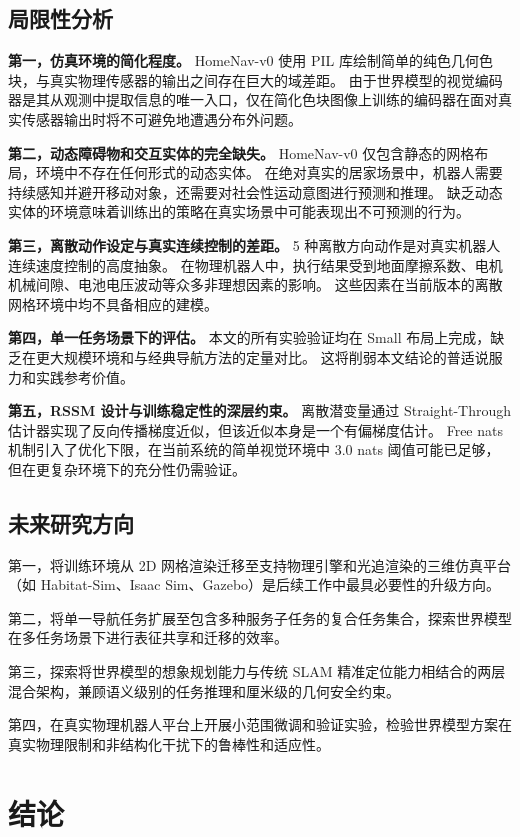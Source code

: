 \documentclass[12pt,a4paper]{ctexart}
\begin{document}
\subsection{局限性分析}

\textbf{第一，仿真环境的简化程度。}
HomeNav-v0 使用 PIL 库绘制简单的纯色几何色块，与真实物理传感器的输出之间存在巨大的域差距。
由于世界模型的视觉编码器是其从观测中提取信息的唯一入口，仅在简化色块图像上训练的编码器在面对真实传感器输出时将不可避免地遭遇分布外问题。

\textbf{第二，动态障碍物和交互实体的完全缺失。}
HomeNav-v0 仅包含静态的网格布局，环境中不存在任何形式的动态实体。
在绝对真实的居家场景中，机器人需要持续感知并避开移动对象，还需要对社会性运动意图进行预测和推理。
缺乏动态实体的环境意味着训练出的策略在真实场景中可能表现出不可预测的行为。

\textbf{第三，离散动作设定与真实连续控制的差距。}
5 种离散方向动作是对真实机器人连续速度控制的高度抽象。
在物理机器人中，执行结果受到地面摩擦系数、电机机械间隙、电池电压波动等众多非理想因素的影响。
这些因素在当前版本的离散网格环境中均不具备相应的建模。

\textbf{第四，单一任务场景下的评估。}
本文的所有实验验证均在 Small 布局上完成，缺乏在更大规模环境和与经典导航方法的定量对比。
这将削弱本文结论的普适说服力和实践参考价值。

\textbf{第五，RSSM 设计与训练稳定性的深层约束。}
离散潜变量通过 Straight-Through 估计器实现了反向传播梯度近似，但该近似本身是一个有偏梯度估计。
Free nats 机制引入了优化下限，在当前系统的简单视觉环境中 3.0 nats 阈值可能已足够，但在更复杂环境下的充分性仍需验证。

\subsection{未来研究方向}

第一，将训练环境从 2D 网格渲染迁移至支持物理引擎和光追渲染的三维仿真平台（如 Habitat-Sim\cite{savva2019habitat}、Isaac Sim、Gazebo）是后续工作中最具必要性的升级方向。

第二，将单一导航任务扩展至包含多种服务子任务的复合任务集合，探索世界模型在多任务场景下进行表征共享和迁移的效率。

第三，探索将世界模型的想象规划能力与传统 SLAM 精准定位能力相结合的两层混合架构，兼顾语义级别的任务推理和厘米级的几何安全约束。

第四，在真实物理机器人平台上开展小范围微调和验证实验，检验世界模型方案在真实物理限制和非结构化干扰下的鲁棒性和适应性。

\section{结论}
\end{document}
